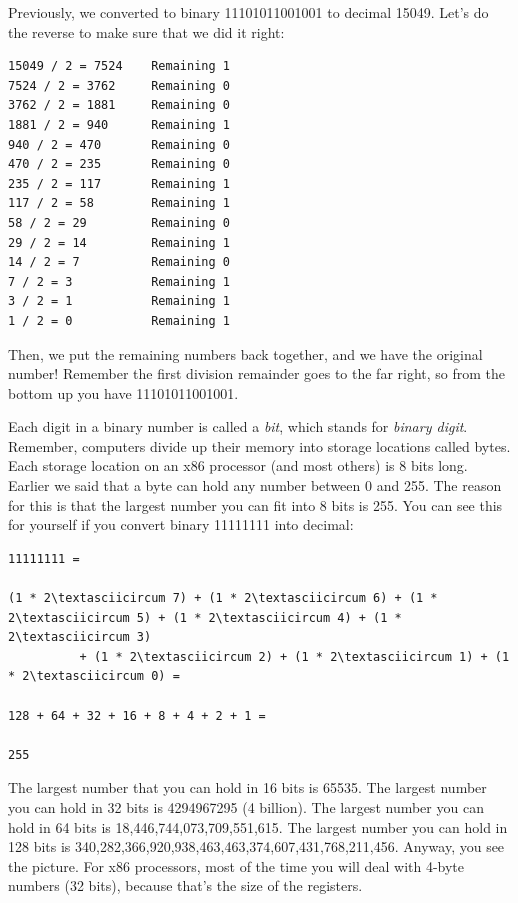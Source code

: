 Previously, we converted to binary 11101011001001 to decimal 15049.  Let's
do the reverse to make sure that we did it right:

\begin{simpletyping}
\begin{lstlisting}
15049 / 2 = 7524    Remaining 1
7524 / 2 = 3762     Remaining 0
3762 / 2 = 1881     Remaining 0
1881 / 2 = 940      Remaining 1
940 / 2 = 470       Remaining 0
470 / 2 = 235       Remaining 0
235 / 2 = 117       Remaining 1
117 / 2 = 58        Remaining 1
58 / 2 = 29         Remaining 0
29 / 2 = 14         Remaining 1
14 / 2 = 7          Remaining 0
7 / 2 = 3           Remaining 1
3 / 2 = 1           Remaining 1
1 / 2 = 0           Remaining 1
\end{lstlisting}
\end{simpletyping}

Then, we put the remaining numbers back together, and we have the original
number!  Remember the first division remainder goes to the far right, so
from the bottom up you have 11101011001001.

Each digit in a binary number is called a \emph{bit}, which
stands for \emph{binary digit}.  Remember, computers divide up
their memory into storage locations called bytes.  Each storage location on an x86 processor (and most others) is 8 bits long.  Earlier we said
that a byte can hold any number between 0 and 255.  The reason for this
is that the largest number you can fit into 8 bits is 255.  You can
see this for yourself if you convert binary 11111111 into decimal:

\begin{simpletyping}
\begin{lstlisting}
11111111 =

(1 * 2\textasciicircum 7) + (1 * 2\textasciicircum 6) + (1 * 2\textasciicircum 5) + (1 * 2\textasciicircum 4) + (1 * 2\textasciicircum 3) 
          + (1 * 2\textasciicircum 2) + (1 * 2\textasciicircum 1) + (1 * 2\textasciicircum 0) = 

128 + 64 + 32 + 16 + 8 + 4 + 2 + 1 =

255
\end{lstlisting}
\end{simpletyping}

The largest number that you can hold in 16 bits is 65535.   The largest
number you can hold in 32 bits is 4294967295 (4 billion).  The largest
number you can hold in 64 bits is 18,446,744,073,709,551,615.  The
largest number you can hold in 128 bits is
340,282,366,920,938,463,463,374,607,431,768,211,456.  Anyway, you
see the picture.  For x86 processors, most of the time you will deal with 4-byte
numbers (32 bits), because that's the size of the registers.


